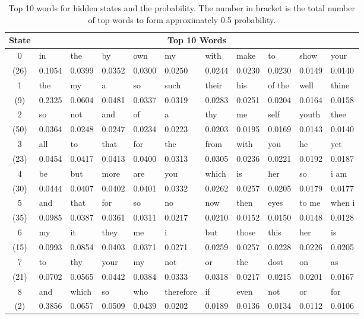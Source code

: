 \begin{table}[h!]
	\centering
	\caption{Top 10 words for hidden states and the probability. The number in bracket is the total number of top words to form approximately 0.5 probability.}\label{tab:top-10-words}
	\begin{tabular}{c||l|l|l|l|l|l|l|l|l|l}
		\hline
		State & \multicolumn{10}{c}{Top 10 Words}\\ \hline
		0 & in & the & by & own & my & with & make & to & show & your \\
		(26) & 0.1054 & 0.0399 & 0.0352 & 0.0300 & 0.0250 & 0.0244 & 0.0230 & 0.0230 & 0.0149 & 0.0140 \\ \hline
		1 & the & my & a & so & such & their & his & of the & well & thine \\
		(9) & 0.2325 & 0.0604 & 0.0481 & 0.0337 & 0.0319 & 0.0283 & 0.0251 & 0.0204 & 0.0164 & 0.0158 \\ \hline
		2 & so & not & and & of & a & thy & me & self & youth & thee \\
		(50) & 0.0364 & 0.0248 & 0.0247 & 0.0234 & 0.0223 & 0.0203 & 0.0195 & 0.0169 & 0.0143 & 0.0140 \\ \hline
		3 & all & to & that & for & the & from & with & you & he & yet \\
		(23) & 0.0454 & 0.0417 & 0.0413 & 0.0400 & 0.0313 & 0.0305 & 0.0236 & 0.0221 & 0.0192 & 0.0187 \\ \hline
		4 & be & but & more & are & you & which & is & her & so & i am \\
		(30) & 0.0444 & 0.0407 & 0.0402 & 0.0401 & 0.0332 & 0.0262 & 0.0257 & 0.0205 & 0.0179 & 0.0177 \\ \hline
		5 & and & that & for & so & no & now & then & eyes & to me & when i \\
		(35) & 0.0985 & 0.0387 & 0.0361 & 0.0311 & 0.0217 & 0.0210 & 0.0152 & 0.0150 & 0.0148 & 0.0128 \\ \hline
		6 & my & it & they & me & i & but & those & this & her & is \\
		(15) & 0.0993 & 0.0854 & 0.0403 & 0.0371 & 0.0271 & 0.0259 & 0.0257 & 0.0228 & 0.0226 & 0.0205 \\ \hline
		7 & to & thy & your & my & not & or & the & dost & on & as \\
		(21) & 0.0702 & 0.0565 & 0.0442 & 0.0384 & 0.0333 & 0.0318 & 0.0217 & 0.0215 & 0.0201 & 0.0167 \\ \hline
		8 & and & which & so & who & therefore & if & even & not & or & for \\
		(2) & 0.3856 & 0.0657 & 0.0509 & 0.0439 & 0.0202 & 0.0189 & 0.0136 & 0.0134 & 0.0112 & 0.0106 \\ \hline

\end{tabular}
\end{table}
